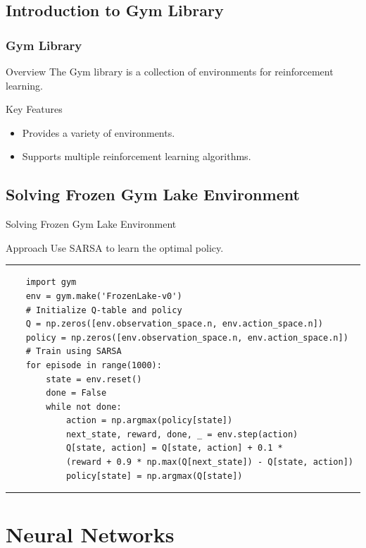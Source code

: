 \documentclass[aspectratio=169, hideothersubsections]{beamer}
\begin{document}
\subsection{Introduction to Gym Library}
\begin{frame}
    \frametitle{Gym Library}
    \begin{block}{Overview}
        The Gym library is a collection of environments for reinforcement learning.
    \end{block}
    \begin{block}{Key Features}
        \begin{itemize}
            \item Provides a variety of environments.
            \item Supports multiple reinforcement learning algorithms.
        \end{itemize}
    \end{block}
\end{frame}

\subsection{Solving Frozen Gym Lake Environment}
\begin{frame}[fragile]{Solving Frozen Gym Lake Environment}
    \begin{block}{Approach}
        Use SARSA to learn the optimal policy.
    \end{block}
\rule{\textwidth}{1pt}
\scriptsize
\begin{verbatim}
    import gym
    env = gym.make('FrozenLake-v0')
    # Initialize Q-table and policy
    Q = np.zeros([env.observation_space.n, env.action_space.n])
    policy = np.zeros([env.observation_space.n, env.action_space.n])
    # Train using SARSA
    for episode in range(1000):
        state = env.reset()
        done = False
        while not done:
            action = np.argmax(policy[state])
            next_state, reward, done, _ = env.step(action)
            Q[state, action] = Q[state, action] + 0.1 * 
            (reward + 0.9 * np.max(Q[next_state]) - Q[state, action])
            policy[state] = np.argmax(Q[state])
\end{verbatim}
\rule{\textwidth}{1pt}
\end{frame}

\section{Neural Networks}
\end{document}

